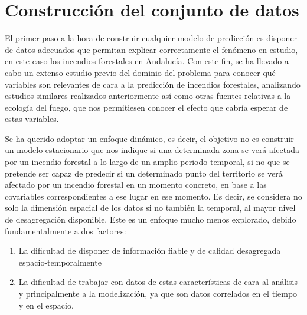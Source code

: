 \documentclass[12pt,a4paper,]{book}
\title{}
\author{Nombre Completo Autor}
\date{18/11/2021}
\def\ifdoblecara{} %
\def\ifprincipal{} %
\let\ifprincipal\undefined %
\providecommand{\tightlist}{%
  \setlength{\itemsep}{0pt}\setlength{\parskip}{0pt}}
\numberwithin{dummy}{section}
\theoremstyle{ocrenumbox}
\theoremstyle{blacknumex}
\theoremstyle{blacknumbox}
\theoremstyle{ocrenum}
\theoremstyle{ocrenum}
\begin{document}




\raggedbottom

\ifdefined\ifprincipal
\else
\setlength{\parindent}{1em}
\pagestyle{fancy}
\setcounter{tocdepth}{4}
\tableofcontents

\fi

\ifdefined\ifdoblecara
\fancyhead{}{}
\fancyhead[LE,RO]{\scriptsize\rightmark}
\fancyfoot[LO,RE]{\scriptsize\slshape \leftmark}
\fancyfoot[C]{}
\fancyfoot[LE,RO]{\footnotesize\thepage}
\else
\fancyhead{}{}
\fancyhead[RO]{\scriptsize\rightmark}
\fancyfoot[LO]{\scriptsize\slshape \leftmark}
\fancyfoot[C]{}
\fancyfoot[RO]{\footnotesize\thepage}
\fi

\renewcommand{\headrulewidth}{0.4pt}
\renewcommand{\footrulewidth}{0.4pt}

\hypertarget{construcciuxf3n-del-conjunto-de-datos}{%
\chapter{Construcción del conjunto de
datos}\label{construcciuxf3n-del-conjunto-de-datos}}

El primer paso a la hora de construir cualquier modelo de predicción es
disponer de datos adecuados que permitan explicar correctamente el
fenómeno en estudio, en este caso los incendios forestales en Andalucía.
Con este fin, se ha llevado a cabo un extenso estudio previo del dominio
del problema para conocer qué variables son relevantes de cara a la
predicción de incendios forestales, analizando estudios similares
realizados anteriormente así como otras fuentes relativas a la ecología
del fuego, que nos permitiesen conocer el efecto que cabría esperar de
estas variables.

Se ha querido adoptar un enfoque dinámico, es decir, el objetivo no es
construir un modelo estacionario que nos indique si una determinada zona
se verá afectada por un incendio forestal a lo largo de un amplio
periodo temporal, si no que se pretende ser capaz de predecir si un
determinado punto del territorio se verá afectado por un incendio
forestal en un momento concreto, en base a las covariables
correspondientes a ese lugar en ese momento. Es decir, se considera no
solo la dimensión espacial de los datos si no también la temporal, al
mayor nivel de desagregación disponible. Este es un enfoque mucho menos
explorado, debido fundamentalmente a dos factores:

\begin{enumerate}
\def\labelenumi{\arabic{enumi}.}
\tightlist
\item
  La dificultad de disponer de información fiable y de calidad
  desagregada espacio-temporalmente
\item
  La dificultad de trabajar con datos de estas características de cara
  al análisis y principalmente a la modelización, ya que son datos
  correlados en el tiempo y en el espacio.
\end{enumerate}
\end{document}
